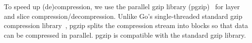 %
 
To speed up (de)compression, we use the parallel gzip library (pgzip)~\cite{pgzip}
for layer and slice compression/decompression.
%
Unlike Go's single-threaded standard gzip compression library~\cite{gogzip},
pgzip splits the compression stream into blocks so that data can be compressed in
parallel. pgzip is compatible with the standard gzip library.


